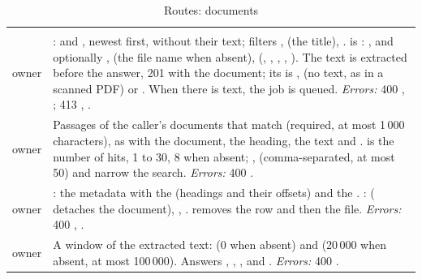 \begin{xltabular}{\textwidth}{@{}L{19mm}Y@{}}
\caption{Routes: documents}\label{tab:api:documents}\\
\toprule {} &  \\ \midrule \endfirsthead
\toprule {} &  \\ \midrule \endhead
\bottomrule \endlastfoot
{}
owner & :  and , newest first, without their text;
  filters ,  (the title), .  is
  : , and optionally ,  (the
  file name when absent),  (, , ,
  , ). The text is extracted before the answer, 201 with the
  document; its  is ,  (no text, as in a scanned
  PDF) or . When there is text, the job  is queued.
  \emph{Errors:} 400 , ; 413 ,
  . \\
\addlinespace
{}
owner & Passages of the caller's documents that match  (required, at most 1\,000
  characters), as  with the document, the heading, the text and .
   is the number of hits, 1 to 30, 8 when absent; , 
  (comma-separated, at most 50) and  narrow the search. \emph{Errors:} 400
  . \\
\addlinespace
{}
owner & : the metadata with the  (headings and their offsets) and the
  . :  ( detaches the document),
  , .  removes the row and then the file. \emph{Errors:}
  400 , . \\
\addlinespace
{}
owner & A window of the extracted text:  (0 when absent) and 
  (20\,000 when absent, at most 100\,000). Answers , , ,
   and . \emph{Errors:} 400 . \\
\end{xltabular}

